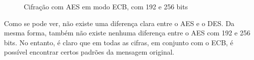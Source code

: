 \begin{figure}[htb]
\caption{Cifração com AES em modo ECB, com 192 e 256 bits}
\end{figure}
%
Como se pode ver, não existe uma diferença clara entre o AES e o DES. Da mesma forma, também não existe nenhuma diferença entre o AES com 192 e 256 bits. No entanto, é claro que em todas as cifras, em conjunto com o ECB, é possível encontrar certos padrões da mensagem original.
%
